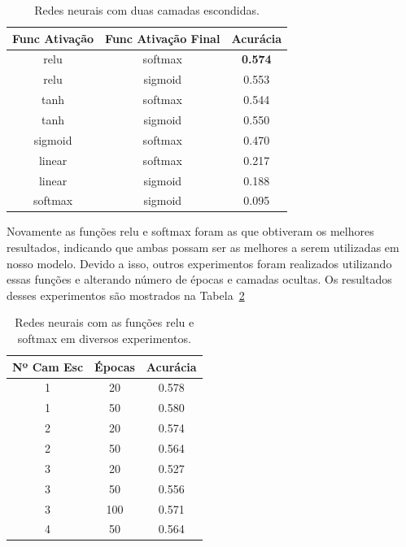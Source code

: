 \documentclass[conference]{IEEEtran}
\begin{document}
\begin{table}[h!]
	\centering	
	\begin{tabular}{ccc} \toprule
		\textbf{Func Ativação} & \textbf{Func Ativação Final} & \textbf{Acurácia} \\ \toprule 	
		relu                   & softmax                      & \textbf{0.574}             \\
		relu                   & sigmoid                      & 0.553             \\
		tanh                   & softmax                      & 0.544             \\
		tanh                   & sigmoid                      & 0.550             \\
		sigmoid                & softmax                      & 0.470             \\
		linear                 & softmax                      & 0.217             \\
		linear                 & sigmoid                      & 0.188             \\
		softmax                & sigmoid                      & 0.095             \\ \bottomrule      
	\end{tabular}
	\caption{Redes neurais com duas camadas escondidas.}
	\label{tab:2hl}
\end{table}

Novamente as funções relu e softmax foram as que obtiveram os melhores resultados, indicando que ambas possam ser as melhores a serem utilizadas em nosso modelo. Devido a isso, outros experimentos foram realizados utilizando essas funções e alterando número de épocas e camadas ocultas. Os resultados desses experimentos são mostrados na Tabela~\ref{tab:misc} 


\begin{table}[h!]
	\centering
	
	\begin{tabular}{ccc} \toprule
	\textbf{Nº Cam Esc} & \textbf{Épocas} & \textbf{Acurácia}    \\ \toprule 	
	1                              & 20              & 0.578                \\
	1                              & 50              & 0.580   				\\
	2                              & 20              & 0.574                \\
	2                              & 50              & 0.564                \\
	3                              & 20              & 0.527                \\
	3                              & 50              & 0.556                \\
	3                              & 100             & 0.571                \\
	4                              & 50              & 0.564                \\
	\bottomrule      
	\end{tabular}
	\caption{Redes neurais com as funções relu e softmax em diversos experimentos.}
	\label{tab:misc}
\end{table}
\end{document}
